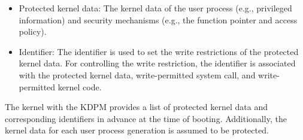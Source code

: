 \begin{itemize}
  
\item Protected kernel data: The kernel data of the user process (e.g.,
privileged information) and security mechanisms (e.g., the function pointer
and access policy).

\item Identifier: The identifier is used to set the write restrictions of the
protected kernel data. For controlling the write restriction, the identifier is
associated with the protected kernel data, write-permitted system call, and
write-permitted kernel code.

  
\end{itemize}


The kernel with the KDPM provides a list of protected kernel data and
corresponding identifiers in advance at the time of booting.
%
Additionally, the kernel data for each user process generation is assumed to be
protected.




